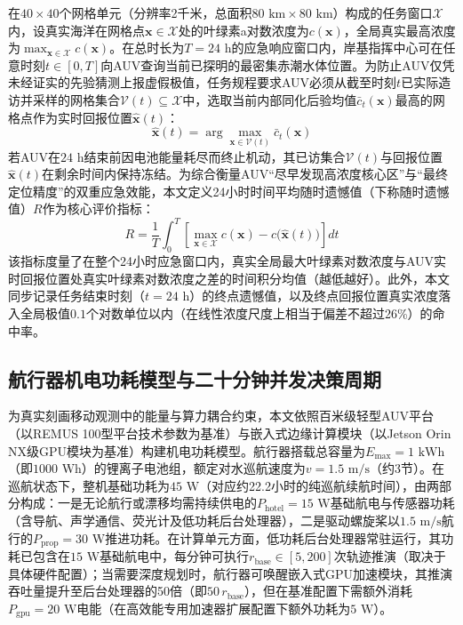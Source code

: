 在$40\times 40$个网格单元（分辨率2千米，总面积$80\text{ km}\times 80\text{ km}$）构成的任务窗口$\mathcal{X}$内，设真实海洋在网格点$\mathbf{x}\in\mathcal{X}$处的叶绿素a对数浓度为$c(\mathbf{x})$，全局真实最高浓度为$\max_{\mathbf{x}\in\mathcal{X}} c(\mathbf{x})$。在总时长为$T=24\text{ h}$的应急响应窗口内，岸基指挥中心可在任意时刻$t\in[0, T]$向AUV查询当前已探明的最密集赤潮水体位置。为防止AUV仅凭未经证实的先验猜测上报虚假极值，任务规程要求AUV必须从截至时刻$t$已实际造访并采样的网格集合$\mathcal{V}(t)\subseteq\mathcal{X}$中，选取当前内部同化后验均值$\bar{c}_t(\mathbf{x})$最高的网格点作为实时回报位置$\hat{\mathbf{x}}(t)$：
\begin{equation}
  \hat{\mathbf{x}}(t) = \arg\max_{\mathbf{x}\in\mathcal{V}(t)} \bar{c}_t(\mathbf{x})
  \label{eq:answer}
\end{equation}
若AUV在$24\text{ h}$结束前因电池能量耗尽而终止机动，其已访集合$\mathcal{V}(t)$与回报位置$\hat{\mathbf{x}}(t)$在剩余时间内保持冻结。为综合衡量AUV“尽早发现高浓度核心区”与“最终定位精度”的双重应急效能，本文定义24小时时间平均随时遗憾值（下称随时遗憾值）$R$作为核心评价指标：
\begin{equation}
  R = \frac{1}{T}\int_0^T \left[\max_{\mathbf{x}\in\mathcal{X}} c(\mathbf{x}) - c\big(\hat{\mathbf{x}}(t)\big)\right] dt
  \label{eq:regret}
\end{equation}
该指标度量了在整个24小时应急窗口内，真实全局最大叶绿素对数浓度与AUV实时回报位置处真实叶绿素对数浓度之差的时间积分均值（越低越好）。此外，本文同步记录任务结束时刻（$t=24\text{ h}$）的终点遗憾值，以及终点回报位置真实浓度落入全局极值$0.1$个对数单位以内（在线性浓度尺度上相当于偏差不超过26\%）的命中率。

\subsection{航行器机电功耗模型与二十分钟并发决策周期}

为真实刻画移动观测中的能量与算力耦合约束，本文依照百米级轻型AUV平台（以REMUS 100型平台技术参数为基准）\cite{remus100}与嵌入式边缘计算模块（以Jetson Orin NX级GPU模块为基准）\cite{jetsonorinnx}构建机电功耗模型。航行器搭载总容量为$E_{\max}=1\text{ kWh}$（即$1000\text{ Wh}$）的锂离子电池组，额定对水巡航速度为$v=1.5\text{ m/s}$（约3节）。在巡航状态下，整机基础功耗为$45\text{ W}$（对应约22.2小时的纯巡航续航时间），由两部分构成：一是无论航行或漂移均需持续供电的$P_{\text{hotel}}=15\text{ W}$基础航电与传感器功耗（含导航、声学通信、荧光计及低功耗后台处理器），二是驱动螺旋桨以$1.5\text{ m/s}$航行的$P_{\text{prop}}=30\text{ W}$推进功耗。在计算单元方面，低功耗后台处理器常驻运行，其功耗已包含在$15\text{ W}$基础航电中，每分钟可执行$r_{\text{base}}\in[5, 200]$次轨迹推演（取决于具体硬件配置）；当需要深度规划时，航行器可唤醒嵌入式GPU加速模块，其推演吞吐量提升至后台处理器的50倍（即$50\,r_{\text{base}}$），但在基准配置下需额外消耗$P_{\text{gpu}}=20\text{ W}$电能（在高效能专用加速器扩展配置下额外功耗为$5\text{ W}$）。

